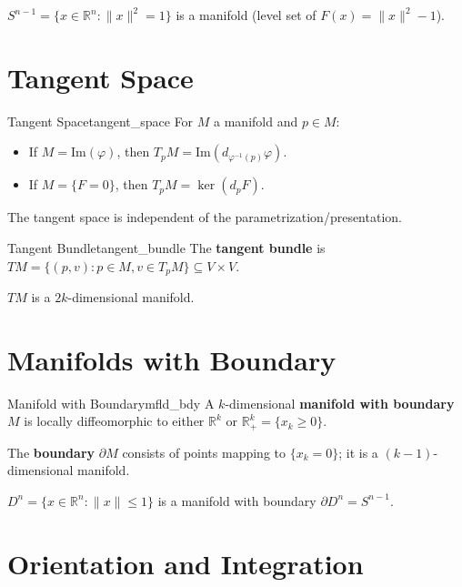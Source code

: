 \documentclass[11pt, letterpaper, openany]{book}
\begin{document}
\begin{example}
$S^{n-1} = \{x \in \mathbb{R}^n : \|x\|^2 = 1\}$ is a manifold (level set of $F(x) = \|x\|^2 - 1$).
\end{example}

\section{Tangent Space}

\begin{defn}{Tangent Space}{tangent_space}
For $M$ a manifold and $p \in M$:
\begin{itemize}
    \item If $M = \text{Im}(\varphi)$, then $T_p M = \text{Im}(d_{\varphi^{-1}(p)} \varphi)$.
    \item If $M = \{F = 0\}$, then $T_p M = \ker(d_p F)$.
\end{itemize}
\end{defn}

The tangent space is independent of the parametrization/presentation.

\begin{defn}{Tangent Bundle}{tangent_bundle}
The \textbf{tangent bundle} is $TM = \{(p, v) : p \in M, v \in T_p M\} \subseteq V \times V$.
\end{defn}

$TM$ is a $2k$-dimensional manifold.

\section{Manifolds with Boundary}

\begin{defn}{Manifold with Boundary}{mfld_bdy}
A $k$-dimensional \textbf{manifold with boundary} $M$ is locally diffeomorphic to either $\mathbb{R}^k$ or $\mathbb{R}^k_+ = \{x_k \geq 0\}$.

The \textbf{boundary} $\partial M$ consists of points mapping to $\{x_k = 0\}$; it is a $(k-1)$-dimensional manifold.
\end{defn}

\begin{example}
$D^n = \{x \in \mathbb{R}^n : \|x\| \leq 1\}$ is a manifold with boundary $\partial D^n = S^{n-1}$.
\end{example}

\section{Orientation and Integration}
\end{document}
